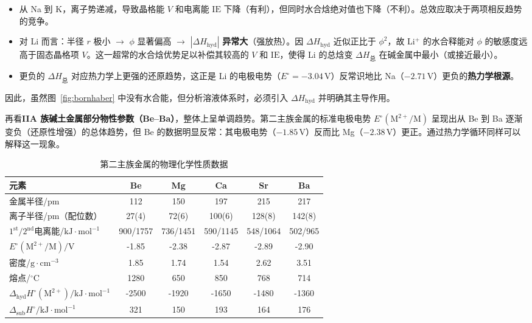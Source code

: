 \documentclass[UTF8]{ctexbook}
\begin{document}
\begin{itemize}
    \item 从 Na 到 K，离子势递减，导致晶格能 $V$ 和电离能 $\mathrm{IE}$ 下降（有利），但同时水合焓绝对值也下降（不利）。总效应取决于两项相反趋势的竞争。
    
    \item 对 Li 而言：半径 $r$ 极小 $\rightarrow$ $\phi$ 显著偏高 $\rightarrow$ $\left| \Delta H_{\text{hyd}} \right|$ \textbf{异常大}（强放热）。因 $\Delta H_{\text{hyd}}$ 近似正比于 $\phi^{2}$，故 Li$^{+}$ 的水合释能对 $\phi$ 的敏感度远高于固态晶格项 $V$。这一超常的水合焓优势足以补偿其较高的 $V$ 和 $\mathrm{IE}$，使得 Li 的总焓变 $\Delta H_{\text{总}}$ 在碱金属中最小（或接近最小）。
    
    \item 更负的 $\Delta H_{\text{总}}$ 对应热力学上更强的还原趋势，这正是 Li 的电极电势（$E^\circ = -3.04\,\mathrm{V}$）反常识地比 Na（$-2.71\,\mathrm{V}$）更负的\textbf{热力学根源}。
\end{itemize}

因此，虽然图~\ref{fig:bornhaber} 中没有水合能，但分析溶液体系时，必须引入 $\Delta H_{\text{hyd}}$ 并明确其主导作用。


再看\textbf{IIA 族碱土金属部分物性参数（Be--Ba）}，整体上呈单调趋势。第二主族金属的标准电极电势 \(E^\circ(\mathrm{M^{2+}/M})\) 呈现出从 Be 到 Ba 逐渐变负（还原性增强）的总体趋势，但 Be 的数据明显反常：其电极电势（\(-1.85\,\mathrm{V}\)）反而比 Mg（\(-2.38\,\mathrm{V}\)）更正。通过热力学循环同样可以解释这一现象。

\begin{table}[htbp]
\centering
\caption{第二主族金属的物理化学性质数据}
\begin{tabular*}{\textwidth}{@{\extracolsep{\fill}}lccccc@{}}
\toprule
元素 & Be & Mg & Ca & Sr & Ba \\
\midrule
金属半径/pm & 112 & 150 & 197 & 215 & 217 \\
离子半径/pm（配位数） & 27(4) & 72(6) & 100(6) & 128(8) & 142(8) \\
\(1^{\mathrm{st}}/2^{\mathrm{nd}}\)电离能/\(\mathrm{kJ\cdot mol^{-1}}\) & 900/1757 & 736/1451 & 590/1145 & 548/1064 & 502/965 \\
\(E^{\circ}(\mathrm{M^{2+}/M})/\mathrm{V}\) & -1.85 & -2.38 & -2.87 & -2.89 & -2.90 \\
密度/\(\mathrm{g\cdot cm^{-3}}\) & 1.85 & 1.74 & 1.54 & 2.62 & 3.51 \\
熔点/\(^{\circ}\mathrm{C}\) & 1280 & 650 & 850 & 768 & 714 \\
\(\Delta_{\mathrm{hyd}}H^{\circ}(\mathrm{M^{2+}})/\mathrm{kJ\cdot mol^{-1}}\) & -2500 & -1920 & -1650 & -1480 & -1360 \\
\(\Delta_{\mathrm{sub}}H^{\circ}/\mathrm{kJ\cdot mol^{-1}}\) & 321 & 150 & 193 & 164 & 176 \\
\bottomrule
\end{tabular*}
\end{table}
\end{document}

